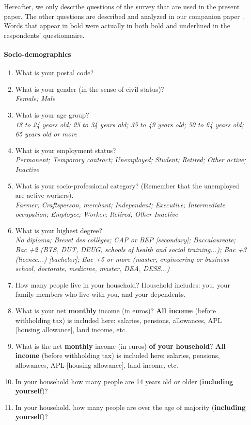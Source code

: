 \documentclass[english,5p,authoryear]{elsarticle}
\begin{document}
\begin{appendices}
Hereafter, we only describe questions of the survey that are used
in the present paper. The other questions are described and analyzed
in our companion paper \citep{douenne_can_2019}. Words that appear in bold were actually in both bold and underlined in the respondents' questionnaire.

\paragraph{Socio-demographics}
\begin{enumerate}[resume,leftmargin=*]
\item What is your postal code? 
\item What is your gender (in the sense of civil status)? \textit{}\\
\textit{Female; Male }
\item What is your age group? \textit{}\\
\textit{18 to 24 years old; 25 to 34 years old; 35 to 49 years old;
50 to 64 years old; 65 years old or more} 
\item What is your employment status? \textit{}\\
\textit{Permanent; Temporary contract; Unemployed; Student; Retired;
Other active; Inactive}
\item What is your socio-professional category? (Remember that the unemployed
are active workers). \textit{}\\
\textit{Farmer; Craftsperson, merchant; Independent; Executive; Intermediate
occupation; Employee; Worker; Retired; Other Inactive} 
\item What is your highest degree? \textit{}\\
\textit{No diploma; Brevet des collèges; CAP or BEP {[}secondary{]};
Baccalaureate; Bac +2 (BTS, DUT, DEUG, schools of health and social
training...); Bac +3 (licence...) {[}bachelor{]}; Bac +5 or more (master,
engineering or business school, doctorate, medicine, master, DEA,
DESS...)}
\item How many people live in your household? Household includes: you, your
family members who live with you, and your dependents. 
\item What is your net \textbf{\textbf{monthly}} income (in euros)? \textbf{\textbf{All
income}} (before withholding tax) is included here: salaries, pensions,
allowances, APL {[}housing allowance{]}, land income, etc. 
\item What is the net \textbf{\textbf{monthly}} income (in euros) \textbf{\textbf{of
your household}}? \textbf{\textbf{All income}} (before withholding
tax) is included here: salaries, pensions, allowances, APL {[}housing
allowance{]}, land income, etc. 
\item In your household how many people are 14 years old or older (\textbf{\textbf{including
yourself}})? 
\item In your household, how many people are over the age of majority (\textbf{\textbf{including
yourself}})? 
\end{enumerate}


\end{appendices}
\end{document}
